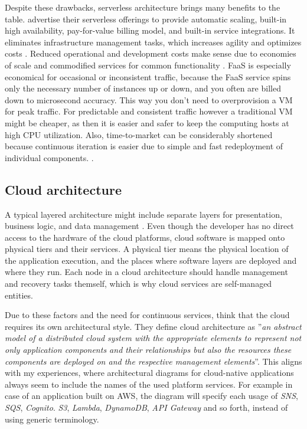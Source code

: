 \documentclass[utf8,english]{gradu3}
\begin{document}
Despite these drawbacks, serverless architecture brings many benefits to the
table. \textcite{AWS-serverless} advertise their serverless offerings to provide
automatic scaling, built-in high availability, pay-for-value billing model, and
built-in service integrations. It eliminates infrastructure management tasks,
which increases agility and optimizes costs \parencite{AWS-serverless}. Reduced
operational and development costs make sense due to economies of scale and
commodified services for common functionality \parencite{Roberts2018}. FaaS is
especially economical for occasional or inconsistent traffic, because the FaaS
service spins only the necessary number of instances up or down, and you often
are billed down to microsecond accuracy. This way you don't need to overprovision a
VM for peak traffic. For predictable and consistent traffic however a
traditional VM might be cheaper, as then it is easier and safer to keep the computing hosts at
high CPU utilization. Also, time-to-market can be considerably shortened because
continuous iteration is easier due to simple and fast redeployment of individual
components. \parencite{Roberts2018}.


\subsection{Cloud architecture}

A typical layered architecture might include separate layers for presentation,
business logic, and data management \parencite[5]{Pahl2018}. Even though the
developer has no direct access to the hardware of the cloud platforms, cloud
software is mapped onto physical tiers and their services. A physical tier means
the physical location of the application execution, and the places where
software layers are deployed and where they run. Each node in a cloud
architecture should handle management and recovery tasks themself, which is why
cloud services are self-managed entities. \parencite[5]{Pahl2018}

Due to these factors and the need for continuous services,
\textcite[5]{Pahl2018} think that the cloud requires its own architectural
style. They define cloud architecture as ''\textit{an abstract model of a distributed
cloud system with the appropriate elements to represent not only application
components and their relationships but also the resources these components are
deployed on and the respective management elements}''. This aligns with my
experiences, where architectural diagrams for cloud-native applications always
seem to include the names of the used platform services. For example in case of an
application built on AWS, the diagram will specify each usage of \textit{SNS},
\textit{SQS}, \textit{Cognito}. \textit{S3}, \textit{Lambda}, \textit{DynamoDB},
\textit{API Gateway} and so forth, instead of using generic terminology.
\end{document}
